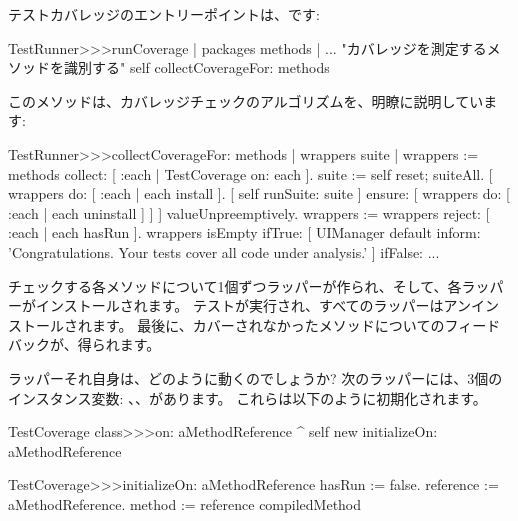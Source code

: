 \documentclass[a4paper,10pt,twoside]{book}
\begin{document}
テストカバレッジのエントリーポイントは、です:
\begin{code}{}
TestRunner>>>runCoverage
	| packages methods |
	... "カバレッジを測定するメソッドを識別する" %
	self collectCoverageFor: methods
\end{code}

このメソッドは、カバレッジチェックのアルゴリズムを、明瞭に説明しています:
\begin{code}{}
TestRunner>>>collectCoverageFor: methods
	| wrappers suite |
	wrappers := methods collect: [ :each | TestCoverage on: each ].
	suite := self
		reset;
		suiteAll.
	[ wrappers do: [ :each | each install ].
	  [ self runSuite: suite ] ensure: [ wrappers do: [ :each | each uninstall ] ] ] valueUnpreemptively.
	wrappers := wrappers reject: [ :each | each hasRun ].
	wrappers isEmpty 
		ifTrue: 
			[ UIManager default inform: 'Congratulations. Your tests cover all code under analysis.' ]
		ifFalse: ...
\end{code}
チェックする各メソッドについて1個ずつラッパーが作られ、そして、各ラッパーがインストールされます。
テストが実行され、すべてのラッパーはアンインストールされます。
最後に、カバーされなかったメソッドについてのフィードバックが、得られます。

ラッパーそれ自身は、どのように動くのでしょうか?
次のラッパーには、3個のインスタンス変数: 、、があります。
これらは以下のように初期化されます。
\begin{code}{}
TestCoverage class>>>on: aMethodReference
	^ self new initializeOn: aMethodReference

TestCoverage>>>initializeOn: aMethodReference
	hasRun := false.
	reference := aMethodReference.
	method := reference compiledMethod
\end{code}
\end{document}
